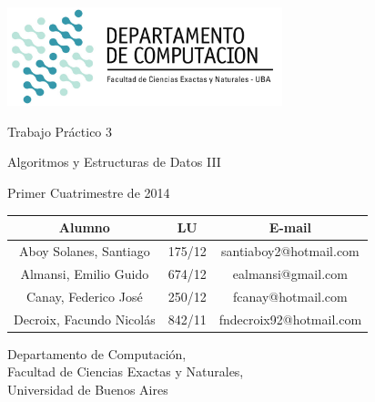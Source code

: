 \documentclass[a4paper, 10pt, twoside]{article}
\begin{document}

\thispagestyle{caratula}

\begin{center}

\includegraphics[width=0.6\textwidth]{./img/DC.jpg} 
\hfill

\vspace{2cm}

\begin{Huge}
Trabajo Práctico 3
\end{Huge}

\vspace{0.5cm}

\begin{Large}
Algoritmos y Estructuras de Datos III
\end{Large}

\vspace{1cm}

\begin{Large}
Primer Cuatrimestre de 2014
\end{Large}

\vspace{2cm}

\begin{tabular}{|c|c|c|}
\hline
Alumno & LU & E-mail\\
\hline
Aboy Solanes, Santiago    & 175/12 & santiaboy2@hotmail.com\\
Almansi, Emilio Guido     & 674/12 & ealmansi@gmail.com\\
Canay, Federico José      & 250/12 & fcanay@hotmail.com\\
Decroix, Facundo Nicolás  & 842/11 & fndecroix92@hotmail.com\\
\hline
\end{tabular}

\vspace{4cm}

Departamento de Computación,\\
Facultad de Ciencias Exactas y Naturales,\\
Universidad de Buenos Aires

\end{center}
\end{document}
